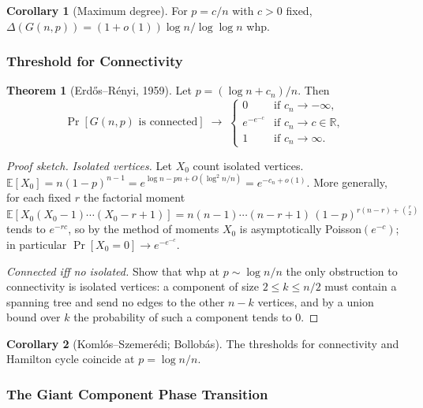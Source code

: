 \documentclass{article}
\theoremstyle{definition}
\newtheorem{theorem}{Theorem}
\newtheorem{corollary}{Corollary}
\begin{document}
\begin{corollary}[Maximum degree]
For $p = c/n$ with $c > 0$ fixed, $\Delta(G(n, p)) = (1 + o(1))\log n / \log\log n$ whp.
\end{corollary}

\subsubsection{Threshold for Connectivity}

\begin{theorem}[Erd\H{o}s--R\'enyi, 1959]\label{thm:connthresh}
Let $p = (\log n + c_n)/n$. Then
\[
  \Pr[G(n, p) \text{ is connected}] \;\to\;
  \begin{cases} 0 & \text{if } c_n \to -\infty, \\
                e^{-e^{-c}} & \text{if } c_n \to c \in \mathbb R, \\
                1 & \text{if } c_n \to \infty. \end{cases}
\]
\end{theorem}

\begin{proof}[Proof sketch]
\emph{Isolated vertices.} Let $X_0$ count isolated vertices.
$\mathbb{E}[X_0] = n(1 - p)^{n - 1} = e^{\log n - pn + O(\log^2 n/n)} = e^{-c_n + o(1)}$.
More generally, for each fixed $r$ the factorial moment
\[
  \mathbb{E}[X_0(X_0 - 1)\cdots(X_0 - r + 1)]
  = n(n - 1)\cdots(n - r + 1)\,(1 - p)^{r(n - r) + \binom{r}{2}}
\]
tends to $e^{-rc}$, so by the method of moments $X_0$ is asymptotically
Poisson$(e^{-c})$; in particular $\Pr[X_0 = 0] \to e^{-e^{-c}}$.

\emph{Connected iff no isolated.} Show that whp at $p \sim \log n/n$
the only obstruction to connectivity is isolated vertices: a
component of size $2 \le k \le n/2$ must contain a spanning tree and send
no edges to the other $n - k$ vertices, and by a
union bound over $k$ the probability of such a component tends to $0$.
\end{proof}

\begin{corollary}[Koml\'os--Szemer\'edi; Bollob\'as]
The thresholds for connectivity and Hamilton cycle coincide at
$p = \log n/n$.
\end{corollary}

\subsubsection{The Giant Component Phase Transition}
\end{document}
